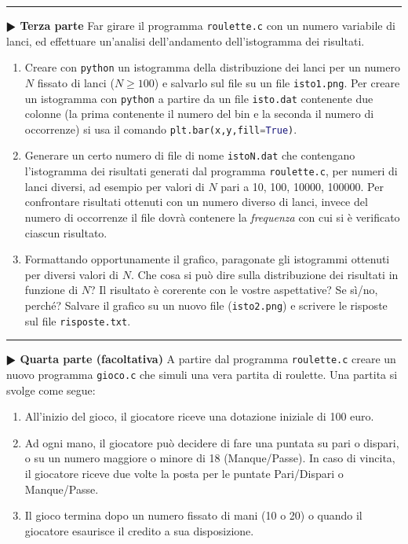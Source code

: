 \documentclass[11pt]{article}
\begin{document}
\hrule
\vspace{2mm}
\textbf{$\RHD$ Terza parte}
Far girare il programma \texttt{roulette.c} con un numero variabile di lanci,
ed effettuare un'analisi dell'andamento dell'istogramma dei risultati.
\begin{enumerate}
\item Creare con \texttt{python} un istogramma della distribuzione dei lanci per un numero $N$ fissato di lanci ($N \ge 100$) e salvarlo sul file su un file \texttt{isto1.png}.
  Per creare un istogramma con \texttt{python} a partire da un file \texttt{isto.dat} contenente due colonne (la prima
  contenente il numero del bin e la seconda il numero di occorrenze)
si usa il comando \lstinline[language=Python]!plt.bar(x,y,fill=True)!.
\item Generare un certo numero di file di nome \texttt{istoN.dat} che contengano l'istogramma dei risultati generati dal programma \texttt{roulette.c}, per numeri di lanci diversi, ad esempio per valori di $N$ pari a 10, 100, 10000, 100000.
 Per confrontare risultati ottenuti con un numero diverso di lanci, invece del numero di occorrenze il file dovr\`a contenere
la {\em frequenza\/} con cui si \`e verificato ciascun risultato.
\item Formattando opportunamente il grafico, paragonate gli istogrammi ottenuti per diversi valori di $N$. Che cosa si
pu\`o dire sulla distribuzione dei risultati in funzione di $N$? Il risultato \`e corerente con le vostre aspettative? Se sì/no, perch\'e? Salvare il grafico su un nuovo file (\texttt{isto2.png}) e scrivere le risposte sul file \texttt{risposte.txt}.
\end{enumerate}


\hrule
\vspace{2mm}
\textbf{$\RHD$ Quarta parte (facoltativa)}
A partire dal programma \texttt{roulette.c} creare un nuovo programma \texttt{gioco.c} che simuli una vera
partita di roulette.
Una partita si svolge come segue:
\begin{enumerate}
\item All'inizio del gioco, il giocatore riceve una dotazione iniziale di 100 euro.
\item Ad ogni mano, il giocatore  pu\`o decidere di fare una puntata  su pari o dispari, o su un numero maggiore o minore di 18 (Manque/Passe). In caso di vincita, il giocatore riceve due volte la posta per le puntate Pari/Dispari o Manque/Passe.
\item Il gioco termina dopo un numero fissato di mani (10 o 20) o quando il giocatore esaurisce il credito a sua disposizione.
\end{enumerate}
\end{document}
